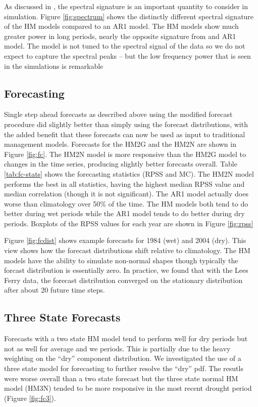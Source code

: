 \documentclass[wrr]{AGUTeX}
\begin{document}
\begin{article}
As discussed in \cite{Kwon:2007fj}, the spectral signature is an important quantity to consider in simulation.  Figure \ref{fig:spectrum} shows the distinctly different spectral signature of the HM models compared to an AR1 model.  The HM models show much greater power in long periods, nearly the opposite signature from and AR1 model. The model is not tuned to the spectral signal of the data so we do not expect to capture the spectral peaks -- but the low frequency power that is seen in the simulations is remarkable 

\subsection{Forecasting} 
Single step ahead forecasts as described above using the modified forecast procedure did slightly better than simply using the forecast distributions, with the added benefit that these forecasts can now be used as input to traditional management models. Forecasts for the HM2G and the HM2N are shown in Figure \ref{fig:fc}.  The HM2N model is more responsive than the HM2G model to changes in the time series, producing slightly better forecasts overall.  Table \ref{tab:fc-stats} shows the forecasting statistics (RPSS and MC).  The HM2N model performs the best in all statistics, having the highest median RPSS value and median correlation (though it is not significant). The AR1 model actually does worse than climatology over 50\% of the time. The HM models both tend to do better during wet periods while the AR1 model tends to do better during dry periods.  Boxplots of the RPSS values for each year are shown in Figure \ref{fig:rpss}

Figure \ref{fig:fcdist} shows example forecasts for 1984 (wet) and 2004 (dry).  This view shows how the forecast distributions shift relative to climatology.  The HM models have the ability to simulate non-normal shapes though typically the forcast distribution is essentially zero. In practice, we found that with the Lees Ferry data, the forecast distribution converged on the stationary distribution after about 20 future time steps. 

\subsection{Three State Forecasts}
Forecasts with a two state HM model tend to perform well for dry periods but not as well for average and we periods. This is partially due to the heavy weighting on the ``dry'' component distribution. We investigated the use of a three state model for forecasting to further resolve the ``dry'' pdf. The resutls were worse overall than a two state forecast but the three state normal HM model (HM3N) tended to be more responsive in the most recent drought period (Figure \ref{fig:fc3}). 


\end{article}
\end{document}
